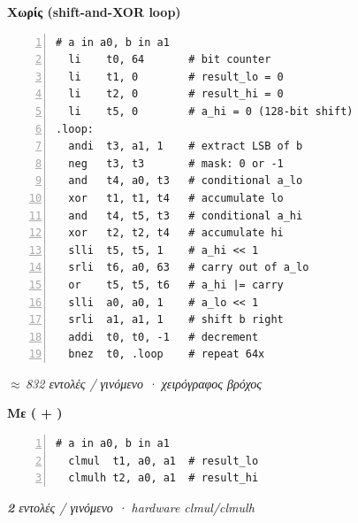 \begingroup
\centering
\begin{minipage}[t]{0.48\textwidth}
  \centering
  {\sffamily\bfseries\small\color{figthreat} Χωρίς \Zbc{} (shift-and-XOR loop)}\par\smallskip
  \begin{lstlisting}[language={[RISC-V]Assembler}, basicstyle=\ttfamily\scriptsize,
    numbers=left, numberstyle=\tiny\color{figneutral}, frame=single,
    rulecolor=\color{figthreat}, backgroundcolor=\color{figthreatfill}, xleftmargin=1.5em]
  # a in a0, b in a1
  li    t0, 64       # bit counter
  li    t1, 0        # result_lo = 0
  li    t2, 0        # result_hi = 0
  li    t5, 0        # a_hi = 0 (128-bit shift)
.loop:
  andi  t3, a1, 1    # extract LSB of b
  neg   t3, t3       # mask: 0 or -1
  and   t4, a0, t3   # conditional a_lo
  xor   t1, t1, t4   # accumulate lo
  and   t4, t5, t3   # conditional a_hi
  xor   t2, t2, t4   # accumulate hi
  slli  t5, t5, 1    # a_hi << 1
  srli  t6, a0, 63   # carry out of a_lo
  or    t5, t5, t6   # a_hi |= carry
  slli  a0, a0, 1    # a_lo << 1
  srli  a1, a1, 1    # shift b right
  addi  t0, t0, -1   # decrement
  bnez  t0, .loop    # repeat 64x
  \end{lstlisting}
  \par\smallskip
  {\sffamily\scriptsize\itshape\color{figthreat} $\approx$\,\num{832} εντολές / γινόμενο · χειρόγραφος βρόχος}
\end{minipage}\hfill
\begin{minipage}[t]{0.48\textwidth}
  \centering
  {\sffamily\bfseries\small\color{figsolution!60!black} Με \Zbc{} (\clmul{} + \clmulh)}\par\smallskip
  \begin{lstlisting}[language={[RISC-V]Assembler}, basicstyle=\ttfamily\scriptsize,
    numbers=left, numberstyle=\tiny\color{figneutral}, frame=single,
    rulecolor=\color{figsolution}, backgroundcolor=\color{figsolutionfill}, xleftmargin=1.5em]
  # a in a0, b in a1
  clmul  t1, a0, a1  # result_lo
  clmulh t2, a0, a1  # result_hi
  \end{lstlisting}
  \par\smallskip
  {\sffamily\scriptsize\itshape\color{figsolution!60!black} \textbf{\num{2}} εντολές / γινόμενο · hardware clmul/clmulh}
\end{minipage}
\endgroup

